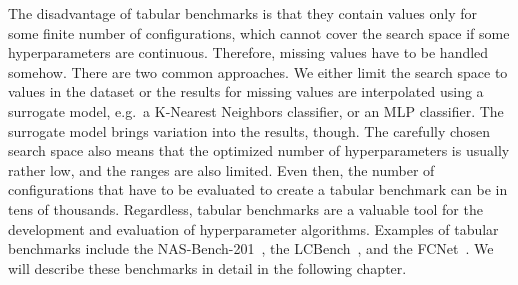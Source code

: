 The disadvantage of tabular benchmarks is that they contain values only for some finite number of configurations, which cannot cover the search space if some hyperparameters are continuous. Therefore, missing values have to be handled somehow. There are two common approaches. We either limit the search space to values in the dataset or the results for missing values are interpolated using a surrogate model, e.g.\ a K-Nearest Neighbors classifier, or an MLP classifier. The surrogate model brings variation into the results, though. The carefully chosen search space also means that the optimized number of hyperparameters is usually rather low, and the ranges are also limited. Even then, the number of configurations that have to be evaluated to create a tabular benchmark can be in tens of thousands. Regardless, tabular benchmarks are a valuable tool for the development and evaluation of hyperparameter algorithms. Examples of tabular benchmarks include the NAS-Bench-201~\cite{dong2020nasbench201}, the LCBench~\cite{ZimLin2021a}, and the FCNet~\cite{klein2019tabular}. We will describe these benchmarks in detail in the following chapter.
